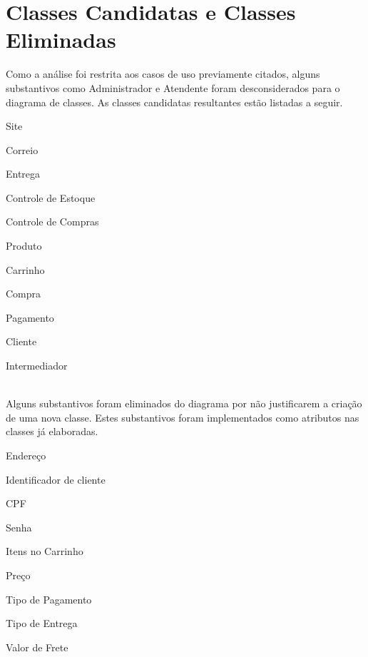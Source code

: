 \documentclass[12pt,a4paper]{article}
\begin{document}
\section{Classes Candidatas e Classes Eliminadas}
Como a análise foi restrita aos casos de uso previamente citados, alguns substantivos como Administrador e Atendente foram desconsiderados para o diagrama de classes.
As classes candidatas resultantes estão listadas a seguir.

\begin{inparaenum}
\item Site
\tab\item Correio
\tab\item Entrega
\tab\item Controle de Estoque
\tab\item Controle de Compras
\tab\item Produto
\tab\item Carrinho
\tab\item Compra
\tab\item Pagamento
\tab\item Cliente
\tab\item Intermediador
\end{inparaenum}\\

Alguns substantivos foram eliminados do diagrama por não justificarem a criação de uma nova classe.
Estes substantivos foram implementados como atributos nas classes já elaboradas.

\begin{inparaenum}
\item Endereço
\tab\item Identificador de cliente
\tab\item CPF
\tab\item Senha
\tab\item Itens no Carrinho
\tab\item Preço
\tab\item Tipo de Pagamento
\tab\item Tipo de Entrega
\tab\item Valor de Frete
\end{inparaenum}
\end{document}
